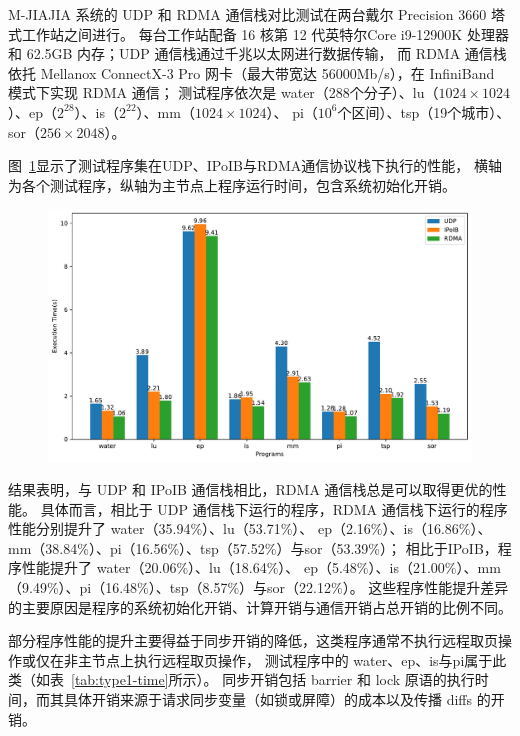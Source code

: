 {    M-JIAJIA 系统的 UDP 和 RDMA 通信栈对比测试在两台戴尔 Precision 3660 塔式工作站之间进行。
    每台工作站配备 16 核第 12 代英特尔Core i9-12900K 处理器和 62.5GB 内存；UDP 通信栈通过千兆以太网进行数据传输，
    而 RDMA 通信栈依托 Mellanox ConnectX-3 Pro 网卡（最大带宽达 56000Mb/s），在 InfiniBand 模式下实现 RDMA 通信；
    测试程序依次是 water（288个分子）、lu（$1024\times1024$）、ep（$2^{28}$）、is（$2^{22}$）、mm（$1024\times1024$）、
    pi（$10^6$个区间）、tsp（19个城市）、sor（$256\times2048$）。

    图~\ref{fig:time-comparison-diff-stacks}显示了测试程序集在UDP、IPoIB与RDMA通信协议栈下执行的性能，
    横轴为各个测试程序，纵轴为主节点上程序运行时间，包含系统初始化开销。

    \begin{figure}[!htbp]
        \centering
        \includegraphics[width=\linewidth]{Img/execution_time_comparison.pdf}
        \label{fig:time-comparison-diff-stacks}
    \end{figure}

    结果表明，与 UDP 和 IPoIB 通信栈相比，RDMA 通信栈总是可以取得更优的性能。
    具体而言，相比于 UDP 通信栈下运行的程序，RDMA 通信栈下运行的程序性能分别提升了 water（35.94\%）、lu（53.71\%）、
    ep（2.16\%）、is（16.86\%）、mm（38.84\%）、pi（16.56\%）、tsp（57.52\%）与sor（53.39\%）；
    相比于IPoIB，程序性能提升了  water（20.06\%）、lu（18.64\%）、
    ep（5.48\%）、is（21.00\%）、mm（9.49\%）、pi（16.48\%）、tsp（8.57\%）与sor（22.12\%）。
    这些程序性能提升差异的主要原因是程序的系统初始化开销、计算开销与通信开销占总开销的比例不同。

    部分程序性能的提升主要得益于同步开销的降低，这类程序通常不执行远程取页操作或仅在非主节点上执行远程取页操作，
    测试程序中的 water、ep、is与pi属于此类（如表~\ref{tab:type1-time}所示）。
    同步开销包括 barrier 和 lock 原语的执行时间，而其具体开销来源于请求同步变量（如锁或屏障）的成本以及传播 diffs 的开销。

}
